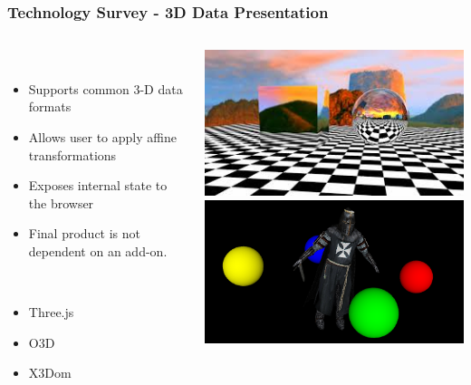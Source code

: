 \begin{frame}
  \frametitle{Technology Survey - 3D Data Presentation}
  \begin{columns}
    \begin{column}{0.7\textwidth}
      \begin{description}[]
        \item[Criteria] \hfill \\
        \begin{itemize}
          \item Supports common 3-D data formats
          \item Allows user to apply affine transformations
          \item Exposes internal state to the browser
          \item Final product is not dependent on an add-on.
        \end{itemize}
        \item[Candidates] \hfill \\
        \begin{itemize}
          \item Three.js
          \item O3D
          \item X3Dom
        \end{itemize}
      \end{description}  
    \end{column} 	
    \begin{column}{0.3\textwidth}
      \includegraphics[width=1\textwidth]{images/scene}\\
      \bigskip
      \bigskip
      \bigskip
      \includegraphics[width=1\textwidth]{images/model}\\

\end{column}
\end{columns}
\end{frame}
